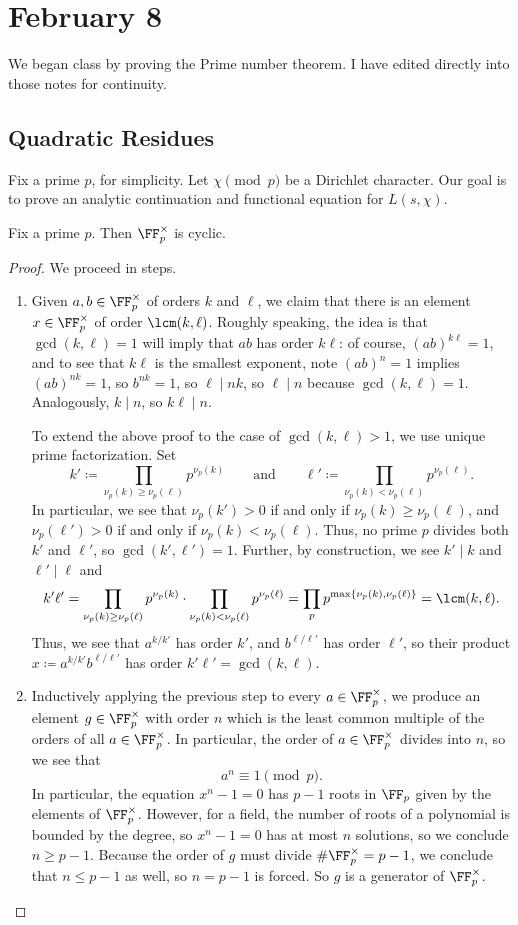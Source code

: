 \documentclass[../notes.tex]{subfiles}
\begin{document}
\section{February 8}

We began class by proving the Prime number theorem. I have edited directly into those notes for continuity.

\subsection{Quadratic Residues}
Fix a prime $p$, for simplicity. Let $\chi\pmod p$ be a Dirichlet character. Our goal is to prove an analytic continuation and functional equation for $L(s,\chi)$.
\begin{proposition} \label{prop:fp-cyclic}
	Fix a prime $p$. Then $\FF_p^\times$ is cyclic.
\end{proposition}
\begin{proof}
	We proceed in steps.
	\begin{enumerate}
		\item Given $a,b\in\FF_p^\times$ of orders $k$ and $\ell$, we claim that there is an element $x\in\FF_p^\times$ of order $\lcm(k,\ell)$. Roughly speaking, the idea is that $\gcd(k,\ell)=1$ will imply that $ab$ has order $k\ell$: of course, $(ab)^{k\ell}=1$, and to see that $k\ell$ is the smallest exponent, note $(ab)^n=1$ implies $(ab)^{nk}=1$, so $b^{nk}=1$, so $\ell\mid nk$, so $\ell\mid n$ because $\gcd(k,\ell)=1$. Analogously, $k\mid n$, so $k\ell\mid n$.
		
		To extend the above proof to the case of $\gcd(k,\ell)>1$, we use unique prime factorization. Set
		\[k'\coloneqq\prod_{\nu_p(k)\ge\nu_p(\ell)}p^{\nu_p(k)}\qquad\text{and}\qquad\ell'\coloneqq\prod_{\nu_p(k)<\nu_p(\ell)}p^{\nu_p(\ell)}.\]
		In particular, we see that $\nu_p(k')>0$ if and only if $\nu_p(k)\ge\nu_p(\ell)$, and $\nu_p(\ell')>0$ if and only if $\nu_p(k)<\nu_p(\ell)$. Thus, no prime $p$ divides both $k'$ and $\ell'$, so $\gcd(k',\ell')=1$. Further, by construction, we see $k'\mid k$ and $\ell'\mid\ell$ and
		\[k'\ell'=\prod_{\nu_p(k)\ge\nu_p(\ell)}p^{\nu_p(k)}\cdot\prod_{\nu_p(k)<\nu_p(\ell)}p^{\nu_p(\ell)}=\prod_pp^{\max\{\nu_p(k),\nu_p(\ell)\}}=\lcm(k,\ell).\]
		Thus, we see that $a^{k/k'}$ has order $k'$, and $b^{\ell/\ell'}$ has order $\ell'$, so their product $x\coloneqq a^{k/k'}b^{\ell/\ell'}$ has order $k'\ell'=\gcd(k,\ell)$.

		\item Inductively applying the previous step to every $a\in\FF_p^\times$, we produce an element $g\in\FF_p^\times$ with order $n$ which is the least common multiple of the orders of all $a\in\FF_p^\times$. In particular, the order of $a\in\FF_p^\times$ divides into $n$, so we see that
		\[a^n\equiv1\pmod p.\]
		In particular, the equation $x^n-1=0$ has $p-1$ roots in $\FF_p$ given by the elements of $\FF_p^\times$. However, for a field, the number of roots of a polynomial is bounded by the degree, so $x^n-1=0$ has at most $n$ solutions, so we conclude $n\ge p-1$. Because the order of $g$ must divide $\#\FF_p^\times=p-1$, we conclude that $n\le p-1$ as well, so $n=p-1$ is forced. So $g$ is a generator of $\FF_p^\times$.
		\qedhere
	\end{enumerate}
\end{proof}
\end{document}
